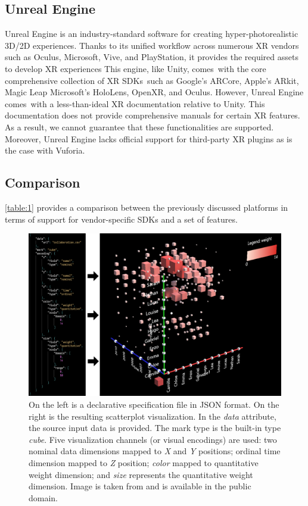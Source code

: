 \documentclass{vgtc}                          %
\begin{document}
\subsection{Unreal Engine}

Unreal Engine is an industry-standard software for creating
hyper-photorealistic 3D/2D experiences. Thanks to its unified workflow across
numerous XR vendors such as Oculus, Microsoft, Vive, and PlayStation, it
provides the required assets to develop XR experiences This engine, like Unity,
comes with the core comprehensive collection of XR SDKs such as Google's
ARCore, Apple's ARkit, Magic Leap Microsoft's HoloLens, OpenXR, and Oculus.
However, Unreal Engine comes with a  less-than-ideal XR documentation relative
to Unity. This documentation does not provide comprehensive manuals for certain
XR features. As a result, we cannot guarantee that these functionalities are
supported. Moreover, Unreal Engine lacks official support for third-party XR
plugins as is the case with Vuforia.
\subsection{Comparison}
\autoref{table:1} provides a comparison between the previously discussed
platforms in terms of support for vendor-specific SDKs and a set of features.

\begin{figure}[t!]
	\centering
	\includegraphics[width=\columnwidth]{dxr_toolkit_00}
    \caption{On the left is a declarative specification file in JSON format. On the right is the resulting
    scatterplot visualization. In the \textit{data} attribute, the source input data is provided. The mark
    type is the built-in type \textit{cube}. Five visualization channels (or visual encodings) are used:
    two nominal data dimensions mapped to \textit{X} and \textit{Y} positions; ordinal time dimension mapped
    to \textit{Z} position; \textit{color} mapped to quantitative weight dimension; and \textit{size}
    represents the quantitative weight dimension.
    Image is taken from \cite{dxr:repo} and is available in the public domain.}
    \label{fig:dxr_toolkit_00}
\end{figure}
\end{document}
